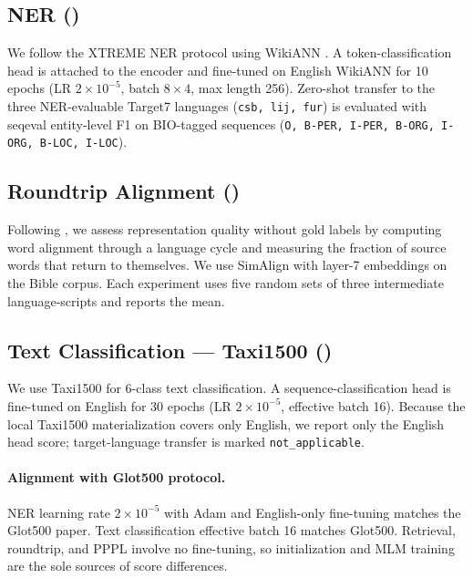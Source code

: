 \subsection{NER (\up)}

We follow the XTREME NER protocol \citep{hu2020xtreme} using WikiANN \citep{pan2017wikiann}.
A token-classification head is attached to the encoder and fine-tuned on English WikiANN
for 10 epochs (LR $2\times10^{-5}$, batch $8\times4$, max length 256).
Zero-shot transfer to the three NER-evaluable Target7 languages (\texttt{csb, lij, fur})
is evaluated with seqeval entity-level F1 on BIO-tagged sequences
(\texttt{O, B-PER, I-PER, B-ORG, I-ORG, B-LOC, I-LOC}).

\subsection{Roundtrip Alignment (\up)}

Following \citet{dufter2018roundtrip}, we assess representation quality without gold labels
by computing word alignment through a language cycle and measuring the fraction of source words
that return to themselves.
We use SimAlign \citep{jalili2020simalign} with layer-7 embeddings on the Bible corpus.
Each experiment uses five random sets of three intermediate language-scripts and reports the mean.

\subsection{Text Classification --- Taxi1500 (\up)}

We use Taxi1500 \citep{ma2023taxi1500} for 6-class text classification.
A sequence-classification head is fine-tuned on English for 30 epochs
(LR $2\times10^{-5}$, effective batch 16).
Because the local Taxi1500 materialization covers only English, we report only the
English head score; target-language transfer is marked \texttt{not\_applicable}.

\paragraph{Alignment with Glot500 protocol.}
NER learning rate $2\times10^{-5}$ with Adam and English-only fine-tuning matches the Glot500 paper.
Text classification effective batch 16 matches Glot500.
Retrieval, roundtrip, and PPPL involve no fine-tuning, so initialization and MLM training
are the sole sources of score differences.
